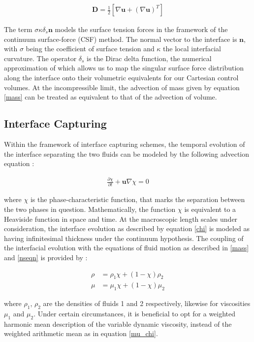 \begin{align}
	\boldsymbol{D} = \frac{1}{2}\left[\nabla \boldsymbol{u} + \left(\nabla \boldsymbol{u}\right)^{T}\right]  
\end{align}


The term $\sigma \kappa \delta_{s}\boldsymbol{n}$ models the surface tension forces in the 
framework of the continuum surface-force (CSF) method. The normal vector to the interface 
is $\boldsymbol{n}$, with $\sigma$ being the coefficient of surface tension and $\kappa$ the 
local interfacial curvature. The operator $\delta_{s}$ is the Dirac delta function, 
the numerical approximation of which allows us to map the singular surface force distribution
along the interface onto their volumetric equivalents for our Cartesian control volumes. 
At the incompressible limit, the advection of mass given by equation \ref{mass} can be 
treated as equivalent to that of the advection of volume.


\subsection*{Interface Capturing}
Within the framework of interface capturing schemes, the 
temporal evolution of the interface separating the two fluids
can be modeled by the following advection equation : 

\begin{align} 
	\frac{\partial \chi}{\partial t} + \boldsymbol{u}\nabla\chi = 0 	
\label{chi}
\end{align}

where $\chi$ is the phase-characteristic function, that marks the 
separation between the two phases in question. Mathematically, the function $\chi$
is equivalent to a Heaviside function in space and time. 
At the macroscopic length scales under consideration, the interface evolution
as described by equation \ref{chi} is modeled as having infinitesimal thickness
under the continuum hypothesis. The coupling of the interfacial evolution with
the equations of fluid motion as described in \ref{mass} and \ref{nseqn} is provided by :  

\begin{align}
	\rho &= \rho_{1}\chi + \left(1 - \chi\right)\rho_{2} \label {rho_chi} \\ 
	\mu  &= \mu_{1}\chi  + \left(1 - \chi\right)\mu_{2}  
  \label{mu_chi}
\end{align}

where $\rho_{1}$, $\rho_{2}$ are the densities of fluids 1 and 2 respectively, 
likewise for viscosities $\mu_{1}$ and $\mu_{2}$. Under certain circumstances, 
it is beneficial to opt for a weighted harmonic mean description of the 
variable dynamic viscosity, instead of the weighted arithmetic mean as in equation \ref{mu_chi}. 


